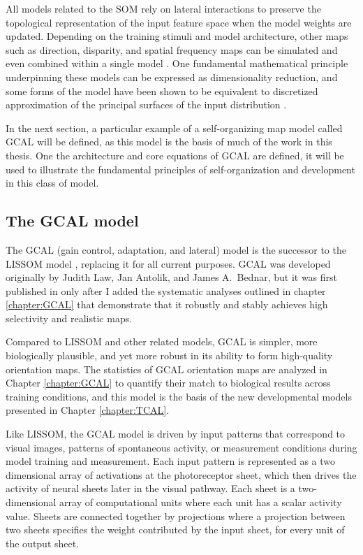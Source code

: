 \documentclass[phd,ianc,twoside]{infthesis}
\begin{document}
All models related to the SOM rely on lateral interactions to preserve
the topological representation of the input feature space when the model
weights are updated. Depending on the training stimuli and model
architecture, other maps such as direction, disparity, and spatial
frequency maps can be simulated and even combined within a single model
\citep{miikkulainen_2005,bednar_jpp12}. One fundamental mathematical
principle underpinning these models can be expressed as
dimensionality reduction, and some forms of the model have been shown
to be equivalent to discretized approximation of the principal
surfaces of the input distribution \citep{ritter_92}.

In the next section, a particular example of a self-organizing map model
called GCAL will be defined, as this model is the basis of much of the
work in this thesis. One the architecture and core equations of GCAL are
defined, it will be used to illustrate the fundamental principles of
self-organization and development in this class of model.

\subsection{The GCAL model}
\label{section:GCAL_background}

The GCAL (gain control, adaptation, and lateral) model is the
successor to the LISSOM model \citep{miikkulainen_2005}, replacing it for all current
purposes. GCAL was developed originally by Judith Law, Jan Antolik,
and James A.\ Bednar, but it was first published in
\citet{stevens_jn13} only after I added the systematic analyses
outlined in chapter \ref{chapter:GCAL} that demonstrate that it
robustly and stably achieves high selectivity and realistic maps.

Compared to LISSOM and other related models, GCAL is simpler, more
biologically plausible, and yet 
more robust in its ability to form high-quality orientation maps. The
statistics of GCAL orientation maps are analyzed in Chapter
\ref{chapter:GCAL} to quantify their match to biological results
across training conditions, and this model is the basis of the new
developmental models presented in Chapter \ref{chapter:TCAL}.

Like LISSOM, the GCAL model is driven by input patterns that correspond
to visual images, patterns of spontaneous activity, or measurement
conditions during model training and measurement. Each input pattern is
represented as a two dimensional array of activations at the
photoreceptor sheet, which then drives the activity of neural sheets
later in the visual pathway. Each sheet is a two-dimensional array of
computational units where each unit has a scalar activity value.
Sheets are connected together by projections where a projection between two
sheets specifies the weight contributed by the input sheet, for every
unit of the output sheet.
\end{document}
